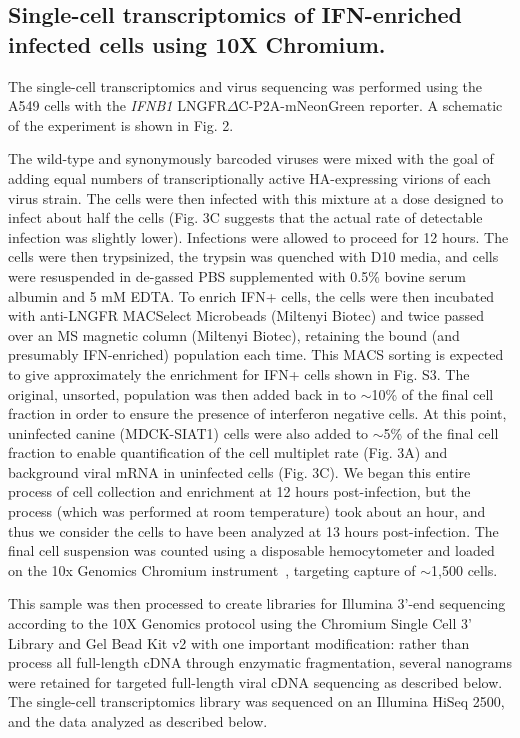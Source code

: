 \documentclass[]{article}
\begin{document}
\subsection*{Single-cell transcriptomics of IFN-enriched infected cells using 10X Chromium.}
The single-cell transcriptomics and virus sequencing was performed using the A549 cells with the \textit{IFNB1} LNGFR$\Delta$C-P2A-mNeonGreen reporter.
A schematic of the experiment is shown in Fig. 2.

The wild-type and synonymously barcoded viruses were mixed with the goal of adding equal numbers of transcriptionally active HA-expressing virions of each virus strain.
The cells were then infected with this mixture at a dose designed to infect about half the cells (Fig. 3C suggests that the actual rate of detectable infection was slightly lower).
Infections were allowed to proceed for 12 hours.
The cells were then trypsinized, the trypsin was quenched with D10 media, and cells were resuspended in de-gassed PBS supplemented with 0.5\% bovine serum albumin and 5 mM EDTA. 
To enrich IFN+ cells, the cells were then incubated with anti-LNGFR MACSelect Microbeads (Miltenyi Biotec) and twice passed over an MS magnetic column (Miltenyi Biotec), retaining the bound (and presumably IFN-enriched) population each time. 
This MACS sorting is expected to give approximately the enrichment for IFN+ cells shown in Fig. S3.
The original, unsorted, population was then added back in to $\sim$10\% of the final cell fraction in order to ensure the presence of interferon negative cells. 
At this point, uninfected canine (MDCK-SIAT1) cells were also added to $\sim$5\% of the final cell fraction to enable quantification of the cell multiplet rate (Fig. 3A) and background viral mRNA in uninfected cells (Fig. 3C). 
We began this entire process of cell collection and enrichment at 12 hours post-infection, but the process (which was performed at room temperature) took about an hour, and thus we consider the cells to have been analyzed at 13 hours post-infection.
The final cell suspension was counted using a disposable hemocytometer and loaded on the 10x Genomics Chromium instrument~\cite{zheng2017massively}, targeting capture of $\sim$1,500 cells. 

This sample was then processed to create libraries for Illumina 3'-end sequencing according to the 10X Genomics protocol using the Chromium Single Cell 3' Library and Gel Bead Kit v2 with one important modification: rather than process all full-length cDNA through enzymatic fragmentation, several nanograms were retained for targeted full-length viral cDNA sequencing as described below.
The single-cell transcriptomics library was sequenced on an Illumina HiSeq 2500, and the data analyzed as described below.
\end{document}
